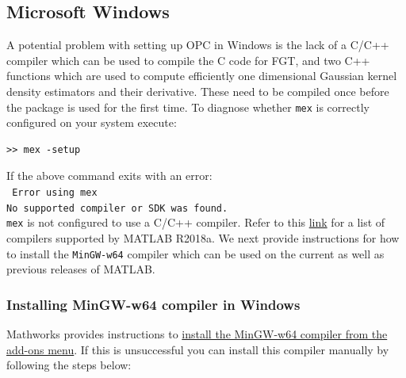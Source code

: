 \documentclass{book}
\begin{document}
\subsection{Microsoft Windows}

A potential problem with setting up OPC in Windows is the lack of a C/C++ compiler which
can be used to compile the C code for FGT, and two C++ functions which are
used to compute efficiently one dimensional Gaussian kernel density estimators
and their derivative. These need to be compiled once before the package is used
for the first time. 
%
To diagnose whether {\tt mex} is correctly configured on your system execute:

\begin{verbatim}
>> mex -setup
\end{verbatim}

\noindent
If the above command exits with an error:\\

\noindent
{\tt
Error using mex\\
No supported compiler or SDK was found.}\\

\noindent
{\tt mex} is not configured to use a C/C++ compiler.
%
Refer to this \href{https://uk.mathworks.com/support/compilers.html}{link} for
a list of compilers supported by MATLAB R2018a.
We next provide instructions for how to install the {\tt MinGW-w64} compiler which
can be used on the current as well as previous releases of MATLAB.


\subsubsection{Installing MinGW-w64 compiler in Windows}

Mathworks provides instructions to
\href{https://uk.mathworks.com/help/releases/R2015b/matlab/matlab_external/install-mingw-support-package.html}
{install the MinGW-w64 compiler from the add-ons menu}.
%
If this is unsuccessful you can install this compiler manually by following the steps below:
\end{document}
